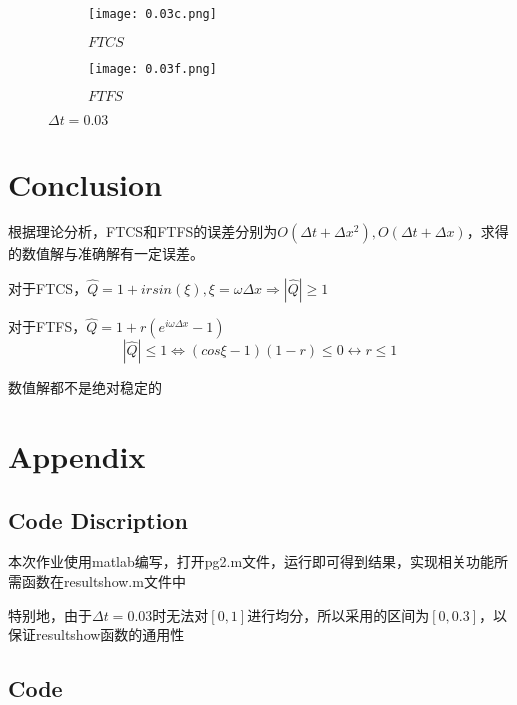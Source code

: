 \documentclass{article}
\begin{document}
\begin{figure}[H]
    \centering
    \begin{subfigure}[b]{0.47\textwidth}
        \centering
        \texttt{[image: 0.03c.png]}
        \caption{$FTCS$}
        
    \end{subfigure}
    \begin{subfigure}[b]{0.47\textwidth}
        \centering
        \texttt{[image: 0.03f.png]}
        \caption{$FTFS$}
        
    \end{subfigure}
    \caption{$\Delta t=0.03$}
\end{figure}
\section{Conclusion}
根据理论分析，FTCS和FTFS的误差分别为$O(\Delta t+\Delta x^2),O(\Delta t+\Delta x)$，求得的数值解与准确解有一定误差。

对于FTCS，$\hat{Q}=1+irsin(\xi),\xi=\omega \Delta x\Rightarrow |\hat{Q}|\geq 1$

对于FTFS，$\hat{Q}=1+r(e^{i\omega \Delta x}-1)$
$$|\hat{Q}|\leq 1\Leftrightarrow (cos\xi-1)(1-r)\leq 0\leftrightarrow r\leq 1$$

数值解都不是绝对稳定的

\section{Appendix}
\subsection{Code Discription}

本次作业使用matlab编写，打开pg2.m文件，运行即可得到结果，实现相关功能所需函数在resultshow.m文件中

特别地，由于$\Delta t=0.03$时无法对$[0,1]$进行均分，所以采用的区间为$[0,0.3]$，以保证resultshow函数的通用性

\subsection{Code}


\end{document}
